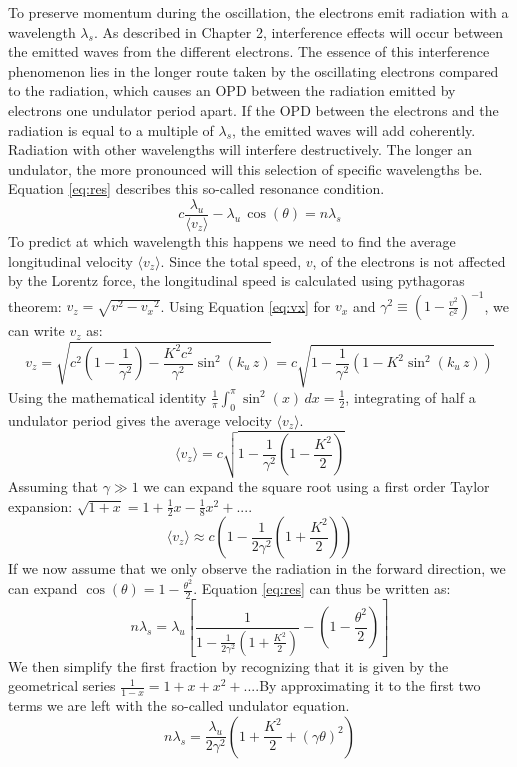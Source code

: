 To preserve momentum during the oscillation, the electrons emit radiation with a wavelength $\lambda_s$. As described in Chapter 2, interference effects will occur between the emitted waves from the different electrons. The essence of this interference phenomenon lies in the longer route taken by the oscillating electrons compared to the radiation, which causes an OPD between the radiation emitted by electrons one undulator period apart. If the OPD between the electrons and the radiation is equal to a multiple of $\lambda_s$, the emitted waves will add coherently. Radiation with other wavelengths will interfere destructively. The longer an undulator, the more pronounced will this selection of specific wavelengths be. Equation \ref{eq:res} describes this so-called resonance condition.%
\begin{equation}c\frac{\lambda_u}{\langle v_z \rangle } -\lambda_u\, \cos{(\theta)} = n \lambda_s \label{eq:res}\end{equation}
To predict at which wavelength this happens we need to find the average longitudinal velocity $\langle v_z \rangle$. Since the total speed, $v$, of the electrons is not affected by the Lorentz force, the longitudinal speed is calculated using pythagoras theorem: $v_z = \sqrt{ {v}^2-{v_x}^2}$. Using Equation \ref{eq:vx} for $v_x$ and $\gamma^2 \equiv (1-\frac{v^2}{c^2})^{-1}$, we can write $v_z$ as: 
\[ v_z = \sqrt{c^2(1-\frac{1}{\gamma^2})-\frac{K^2 c^2}{\gamma^2}\sin^2(k_u\,z)} = c \sqrt{1-\frac{1}{\gamma^2}(1-K^2\sin^2(k_u\,z))}\]
Using the mathematical identity $\frac{1}{\pi}\int_{0}^{\pi} \sin^2( x ) \, dx =\frac{1}{2} $, integrating of half a undulator period gives the average velocity $\langle v_z \rangle$.
\[ \langle v_z \rangle = c\sqrt{1-\frac{1}{\gamma^2}(1-\frac{K^2}{2})}\]
Assuming that ${\gamma} \gg 1$ we can expand the square root using a first order Taylor expansion: $\sqrt{1+x} = 1+\frac{1}{2}x-\frac{1}{8}x^2+ ...$.
\[\langle v_z \rangle \approx c(1-\frac{1}{2\gamma^2}(1+\frac{K^2}{2}) )\]
If we now assume that we only observe the radiation in the forward direction, we can expand $\cos{(\theta)} = 1-\frac{\theta^2}{2}$. 
Equation \ref{eq:res} can thus be written as:
\[ n \lambda_s = \lambda_u[\frac{1}{1-\frac{1}{2 \gamma^2}(1+\frac{K^2}{2})} - (1-\frac{\theta^2}{2})]\]
We then simplify the first fraction by recognizing that it is given by the geometrical series $\frac{1}{1-x} = 1+x+x^2+...$.By approximating it to the first two terms we are left with the so-called undulator equation.
\begin{equation}\label{eq:undulator}
n \lambda_s = \frac{\lambda_u}{2 \gamma^2}(1+\frac{K^2}{2}+(\gamma\theta)^2)
\end{equation} 

